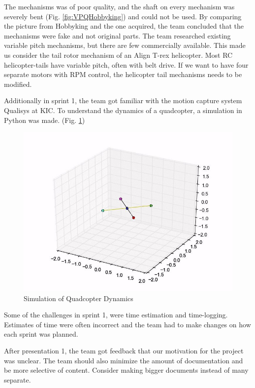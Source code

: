 \bigskip
The mechanisms was of poor quality, and the shaft on every mechanism was severely bent (Fig. \ref{fig:VPQHobbyking}) and could not be used. By comparing the picture from Hobbyking and the one acquired, the team concluded that the mechanisms were fake and not original parts. The team researched existing variable pitch mechanisms, but there are few commercially available. This made us consider the tail rotor mechanism of an Align T-rex helicopter. Most RC helicopter-tails have variable pitch, often with belt drive. If we want to have four separate motors with RPM control, the helicopter tail mechanisms needs to be modified.\bigskip

Additionally in sprint 1, the team got familiar with the motion capture system Qualisys at KIC. To understand the dynamics of a quadcopter, a simulation in Python was made. (Fig. \ref{fig:simulation}) 

\begin{figure}[h]
        \centering
        \includegraphics[scale = 0.4]{VAPIQ-PICTURES/simulation}
        \caption{Simulation of Quadcopter Dynamics}
        \label{fig:simulation}
\end{figure}  
\clearpage

Some of the challenges in sprint 1, were time estimation and time-logging. Estimates of time were often incorrect and the team had to make changes on how each sprint was planned.\bigskip

After presentation 1, the team got feedback that our motivation for the project was unclear. The team should also minimize the amount of documentation and be more selective of content. Consider making bigger documents instead of many separate. \bigskip


